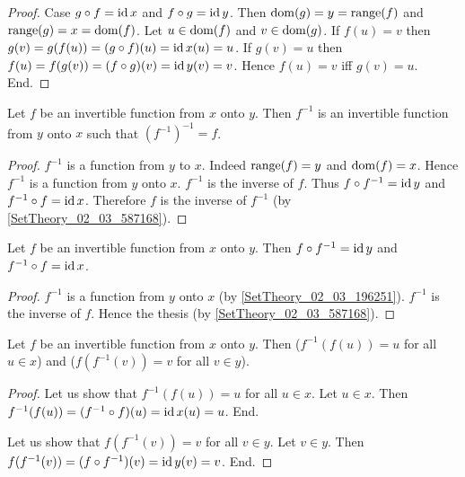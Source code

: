 \documentclass[../../set-theory.ftl.tex]{subfiles}
\begin{document}
\begin{forthel}
\begin{proof}
      Case $g \circ f = \operatorname{id}{x}$ and $f \circ g = \operatorname{id}{y}$.
        Then $\operatorname{dom}(g) = y = \operatorname{range}(f)$ and $\operatorname{range}(g) = x = \operatorname{dom}(f)$.
        Let $u \in \operatorname{dom}(f)$ and $v \in \operatorname{dom}(g)$.
        If $f(u) = v$ then $g(v) = g(f(u)) = (g \circ f)(u) = \operatorname{id}{x}(u) = u$.
        If $g(v) = u$ then $f(u) = f(g(v)) = (f \circ g)(v) = \operatorname{id}{y}(v) = v$.
        Hence $f(u) = v$ iff $g(v) = u$.
      End.
    \end{proof}

    \begin{proposition}\label{SetTheory_02_03_196251}
      Let $f$ be an invertible function from $x$ onto $y$.
      Then $f^{-1}$ is an invertible function from $y$ onto $x$ such that $(f^{-1})^{-1} = f$.
    \end{proposition}
    \begin{proof}
      $f^{-1}$ is a function from $y$ to $x$.
      Indeed $\operatorname{range}(f) = y$ and $\operatorname{dom}(f) = x$.
      Hence $f^{-1}$ is a function from $y$ onto $x$.
      $f^{-1}$ is the inverse of $f$.
      Thus $f \circ f^{-1} = \operatorname{id}{y}$ and $f^{-1} \circ f = \operatorname{id}{x}$.
      Therefore $f$ is the inverse of $f^{-1}$ (by \ref{SetTheory_02_03_587168}).
    \end{proof}

    \begin{proposition}\label{SetTheory_02_03_601485}
      Let $f$ be an invertible function from $x$ onto $y$.
      Then $f \circ f^{-1} = \operatorname{id}{y}$ and $f^{-1} \circ f = \operatorname{id}{x}$.
    \end{proposition}
    \begin{proof}
      $f^{-1}$ is a function from $y$ onto $x$ (by \ref{SetTheory_02_03_196251}).
      $f^{-1}$ is the inverse of $f$.
      Hence the thesis (by \ref{SetTheory_02_03_587168}).
    \end{proof}

    \begin{proposition}\label{SetTheory_02_03_173329}
      Let $f$ be an invertible function from $x$ onto $y$.
      Then ($f^{-1}(f(u)) = u$ for all $u \in x$) and ($f(f^{-1}(v)) = v$ for all $v \in y$).
    \end{proposition}
    \begin{proof}
      Let us show that  $f^{-1}(f(u)) = u$ for all $u \in x$.
        Let $u \in x$.
        Then $f^{-1}(f(u)) = (f^{-1} \circ f)(u) = \operatorname{id}{x}(u) = u$.
      End.

      Let us show that $f(f^{-1}(v)) = v$ for all $v \in y$.
        Let $v \in y$.
        Then $f(f^{-1}(v)) = (f \circ f^{-1})(v) = \operatorname{id}{y}(v) = v$.
      End.
    \end{proof}


\end{forthel}
\end{document}
